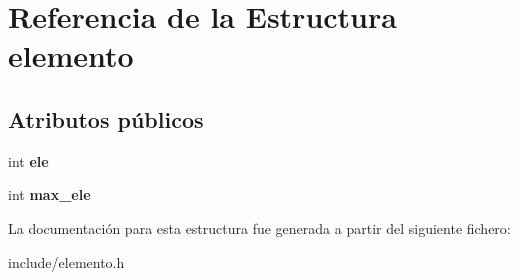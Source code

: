 \section{Referencia de la Estructura elemento}
\label{structelemento}
\subsection*{Atributos públicos}
\begin{DoxyCompactItemize}
\item 
int {\bfseries ele}\label{structelemento_a954579dc7ed0033eefa875742ece867b}

\item 
int {\bfseries max\+\_\+ele}\label{structelemento_abe7d5f0f605ec1757cd1d266a1d3007c}

\end{DoxyCompactItemize}


La documentación para esta estructura fue generada a partir del siguiente fichero\+:\begin{DoxyCompactItemize}
\item 
include/elemento.\+h\end{DoxyCompactItemize}
